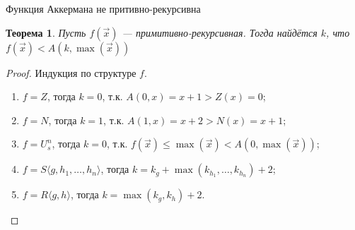 \documentclass[aspectratio=169]{beamer}
\newtheorem{thm}{Теорема}[section]
\begin{document}
\begin{frame}{Функция Аккермана не притивно-рекурсивна}
\begin{thm}Пусть $f(\overrightarrow{x})$ --- примитивно-рекурсивная.
Тогда найдётся $k$, что $f(\overrightarrow{x}) < A(k,\max(\overrightarrow{x}))$\end{thm}

\begin{proof}
Индукция по структуре $f$.
\begin{enumerate}
\item $f = Z$, тогда $k = 0$, т.к. $A(0,x) = x+1 > Z(x) = 0$;
\item $f = N$, тогда $k = 1$, т.к. $A(1,x) = x + 2 > N(x) = x+1$;
\item $f = U^n_s$, тогда $k = 0$, т.к. $f(\overrightarrow{x}) \le \max(\overrightarrow{x}) < A(0,\max(\overrightarrow{x}))$;
\item $f = S\langle g,h_1,\dots,h_n\rangle$, тогда $k = k_g + \max(k_{h_1},\dots,k_{h_n}) + 2$;
\item $f = R\langle g,h \rangle$, тогда $k = \max(k_g,k_h)+2$. %
\end{enumerate}
\end{proof}
\end{frame}
\end{document}

